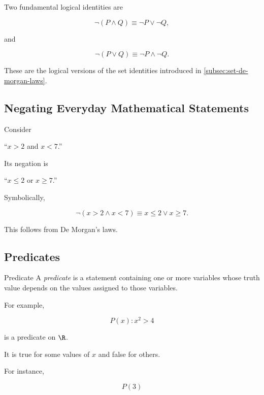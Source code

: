 Two fundamental logical identities are

\[ \neg(P\land Q)\equiv\neg P\lor\neg Q, \]

and

\[ \neg(P\lor Q)\equiv\neg P\land\neg Q. \]

These are the logical versions of the set identities introduced in
\cref{subsec:set-de-morgan-laws}.

\subsection{Negating Everyday Mathematical Statements}
\label{subsec:negating-statements}

Consider

\begin{center}
``\(x>2\) and \(x<7\).''
\end{center}

Its negation is

\begin{center}
``\(x\leq2\) or \(x\geq7\).''
\end{center}

Symbolically,

\[ \neg(x>2\land x<7)\equiv x\leq2\lor x\geq7. \]

This follows from De Morgan's laws.

\subsection{Predicates}
\label{subsec:predicates}

\begin{definitionbox}{Predicate}
A \emph{predicate} is a statement containing one or more variables whose
truth value depends on the values assigned to those variables.
\end{definitionbox}

For example,

\[ P(x):x^2>4 \]

is a predicate on \(\R\).

It is true for some values of \(x\) and false for others.

For instance,

\[ P(3) \]

